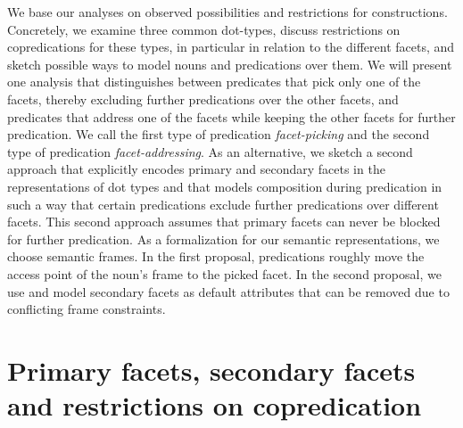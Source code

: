 \documentclass[output=paper,colorlinks,citecolor=brown,chinesefont]{langscibook}
\begin{document}
We base our analyses on observed possibilities and restrictions for  constructions. Concretely, we %
  examine %
  three common dot-types, %
   discuss restrictions on copredications for these types, in particular in relation to the different facets, %
    and sketch %
    possible ways to model  nouns and predications over them.
We will present one analysis that distinguishes between predicates that pick only one of the facets, thereby excluding further predications over the other facets, and predicates that address one of the  facets while keeping the other facets for further predication.
We call the first type of predication \emph{facet-picking} and the second type of predication \emph{facet-addressing}. As an alternative, we sketch a second approach that explicitly encodes primary and secondary facets in the representations of dot types and that models composition during predication in such a way that certain predications exclude further predications over different facets. This second approach assumes that primary facets can never be blocked for further predication. As a formalization for our semantic representations, we choose semantic frames. In the first proposal,  predications roughly move the access point of the noun's frame to the picked facet. In the second proposal, we use  and model secondary facets as default attributes that can be removed due to conflicting frame constraints. %
\section{Primary facets, secondary facets and restrictions on copredication}
\label{sec:prim:Chen}
\end{document}

